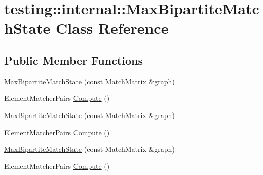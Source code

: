 \hypertarget{classtesting_1_1internal_1_1_max_bipartite_match_state}{}\section{testing\+::internal\+::Max\+Bipartite\+Match\+State Class Reference}
\label{classtesting_1_1internal_1_1_max_bipartite_match_state}
\subsection*{Public Member Functions}
\begin{DoxyCompactItemize}
\item 
\mbox{\hyperlink{classtesting_1_1internal_1_1_max_bipartite_match_state_a9d0166d5cc7afd1b741f6c312df72b54}{Max\+Bipartite\+Match\+State}} (const Match\+Matrix \&graph)
\item 
Element\+Matcher\+Pairs \mbox{\hyperlink{classtesting_1_1internal_1_1_max_bipartite_match_state_af6efab664ee390925b24d023f1368192}{Compute}} ()
\item 
\mbox{\hyperlink{classtesting_1_1internal_1_1_max_bipartite_match_state_a9d0166d5cc7afd1b741f6c312df72b54}{Max\+Bipartite\+Match\+State}} (const Match\+Matrix \&graph)
\item 
Element\+Matcher\+Pairs \mbox{\hyperlink{classtesting_1_1internal_1_1_max_bipartite_match_state_af6efab664ee390925b24d023f1368192}{Compute}} ()
\item 
\mbox{\hyperlink{classtesting_1_1internal_1_1_max_bipartite_match_state_a9d0166d5cc7afd1b741f6c312df72b54}{Max\+Bipartite\+Match\+State}} (const Match\+Matrix \&graph)
\item 
Element\+Matcher\+Pairs \mbox{\hyperlink{classtesting_1_1internal_1_1_max_bipartite_match_state_af6efab664ee390925b24d023f1368192}{Compute}} ()
\end{DoxyCompactItemize}
